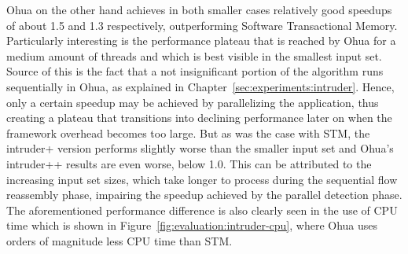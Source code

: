 Ohua on the other hand achieves in both smaller cases relatively good speedups of about 1.5 and 1.3 respectively, outperforming Software Transactional Memory.
Particularly interesting is the performance plateau that is reached by Ohua for a medium amount of threads and which is best visible in the smallest input set.
Source of this is the fact that a not insignificant portion of the algorithm runs sequentially in Ohua, as explained in Chapter~\ref{sec:experiments:intruder}.
Hence, only a certain speedup may be achieved by parallelizing the application, thus creating a plateau that transitions into declining performance later on when the framework overhead becomes too large.
But as was the case with STM, the intruder+ version performs slightly worse than the smaller input set and Ohua's intruder++ results are even worse, below 1.0.
This can be attributed to the increasing input set sizes, which take longer to process during the sequential flow reassembly phase, impairing the speedup achieved by the parallel detection phase.
The aforementioned performance difference is also clearly seen in the use of CPU time which is shown in Figure~\ref{fig:evaluation:intruder-cpu}, where Ohua uses orders of magnitude less CPU time than STM.

